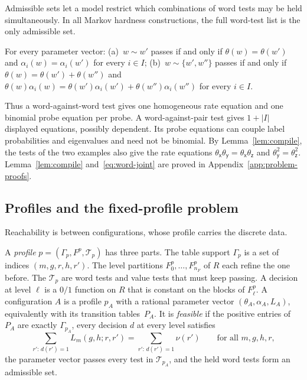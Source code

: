 Admissible sets let a model restrict which combinations of word tests may
be held simultaneously. In all Markov hardness constructions, the full
word-test list is the only admissible set.

\begin{lemma}\label{lem:compile}
For every parameter vector:
(a)~$w\sim w'$ passes if and only if $\theta(w)=\theta(w')$ and
$\alpha_i(w)=\alpha_i(w')$ for every $i\in I$;
(b)~$w\sim\{w',w''\}$ passes if and only if
$\theta(w)=\theta(w')+\theta(w'')$ and
$\theta(w)\alpha_i(w)=\theta(w')\alpha_i(w')+\theta(w'')\alpha_i(w'')$ for
every $i\in I$.
\end{lemma}

Thus a word-against-word test gives one homogeneous rate equation and one
binomial probe equation per probe. A word-against-pair test gives $1+|I|$
displayed equations, possibly dependent. Its probe equations can couple
label probabilities and eigenvalues and need not be binomial. By Lemma~\ref{lem:compile},
the tests of the two examples also give the rate equations
$\theta_{\mathsf x}\theta_{\mathsf y}=\theta_{\mathsf x}\theta_{\mathsf z}$
and $\theta_{\mathsf y}^2=\theta_{\mathsf z}^2$. Lemma~\ref{lem:compile}
and~\eqref{eq:word-joint} are proved in Appendix~\ref{app:problem-proofs}.

\subsection{Profiles and the fixed-profile problem}\label{sec:profiles}

Reachability is between configurations, whose profile carries the discrete
data.

\begin{definition}\label{def:profile}
A \emph{profile} $p=(\Gamma_p,F^p,\mathcal T_p)$ has three parts. The
table support $\Gamma_p$ is a set of indices $(m,g,r,h,r')$. The level
partitions $F^p_0,\dots,F^p_{n_F}$ of $R$ each refine the one before. The
 $\mathcal T_p$ are word tests and value tests that
must keep passing. A decision at level $\ell$ is a $0/1$ function on $R$
that is constant on the blocks of $F^p_\ell$. A configuration $A$ is a
profile $p_A$ with a rational parameter vector
$(\theta_A,\alpha_A,L_A)$, equivalently with its transition tables~$P_A$.
It is \emph{feasible} if the positive entries of $P_A$ are exactly
$\Gamma_{p_A}$, every decision $d$ at every level satisfies
\[
  \sum_{r':\,d(r')=1}L_m(g,h;r,r')=\sum_{r':\,d(r')=1}\nu(r')
  \qquad\text{for all }m,g,h,r,
\]
the parameter vector passes every test in $\mathcal T_{p_A}$, and the held
word tests form an admissible set.
\end{definition}


